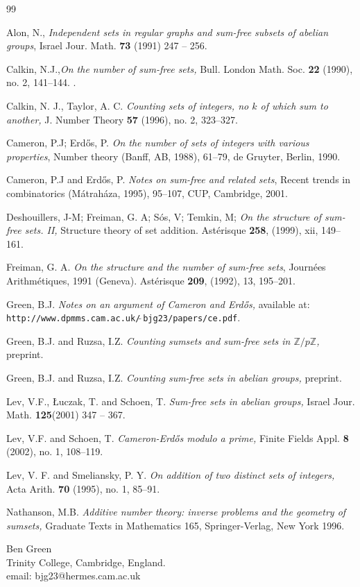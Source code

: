 \documentclass[a4paper,12pt]{article}
\begin{document}
\begin{thebibliography}{99}

 Alon, N., \emph{Independent sets in regular graphs and sum-free subsets of abelian groups}, Israel Jour. Math. \textbf{73} (1991) 247 -- 256.

 Calkin, N.J.,\emph{On the number of sum-free sets,} 
Bull. London Math. Soc. \textbf{22} (1990), no. 2, 141--144. 
.

 Calkin, N. J., Taylor, A. C. \emph{Counting sets of integers, no $k$ of which sum to another,} J. Number Theory \textbf{57} (1996), no. 2, 323--327.

 Cameron, P.J; Erd\H{o}s, P. \emph{On the number of sets of integers with various properties}, Number theory (Banff, AB, 1988), 61--79, de Gruyter, Berlin, 1990. 

 Cameron, P.J and Erd\H{o}s, P. \emph{Notes on sum-free and related sets}, Recent trends in combinatorics (M\'atrah\'aza, 1995), 95--107, CUP, Cambridge, 2001. 

 Deshouillers, J-M; Freiman, G. A; S\'os, V; Temkin, M;
\emph{On the structure of sum-free sets. II,}  Structure theory of set addition. 
Ast\'erisque \textbf{258}, (1999), xii, 149--161.  

 Freiman, G. A. \emph{On the structure and the number of sum-free sets}, 
Journ\'ees Arithm\'etiques, 1991 (Geneva). 
Ast\'erisque \textbf{209}, (1992), 13, 195--201.  

 Green, B.J. \emph{Notes on an argument of Cameron and Erd\H{o}s,} available at:\\ \texttt{http://www.dpmms.cam.ac.uk/$\tilde{\;}$bjg23/papers/ce.pdf}.

 Green, B.J. and Ruzsa, I.Z. \emph{Counting sumsets and sum-free sets in $\mathbb{Z}/p\mathbb{Z}$,} preprint.

 Green, B.J. and Ruzsa, I.Z. \emph{Counting sum-free sets in abelian groups,} preprint.

 Lev, V.F., {\L}uczak, T. and Schoen, T. \emph{Sum-free sets
in abelian groups,} Israel Jour. Math. \textbf{125}(2001) 347 -- 367.


 Lev, V.F. and Schoen, T. \emph{Cameron-Erd\H{o}s modulo a
prime,} Finite Fields Appl. \textbf{8} (2002), no. 1, 108--119. 

Lev, V. F. and Smeliansky, P. Y. \emph{On addition of two distinct sets of integers,} 
Acta Arith. \textbf{70} (1995), no. 1, 85--91. 

 Nathanson, M.B. \emph{Additive number theory: inverse problems and the geometry of sumsets,} Graduate Texts in Mathematics 165, Springer-Verlag, New York 1996.

\end{thebibliography}
\noindent Ben Green\\
Trinity College, Cambridge, England.\\
email: bjg23@hermes.cam.ac.uk

     
\end{document}
